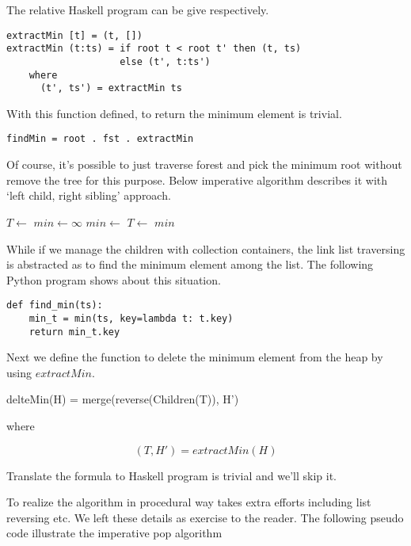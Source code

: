 \documentclass{article}
\begin{document}
The relative Haskell program can be give respectively.

\lstset{language=Haskell}
\begin{lstlisting}
extractMin [t] = (t, [])
extractMin (t:ts) = if root t < root t' then (t, ts)
                    else (t', t:ts')
    where
      (t', ts') = extractMin ts
\end{lstlisting}

With this function defined, to return the minimum element is trivial.

\begin{lstlisting}
findMin = root . fst . extractMin
\end{lstlisting}

Of course, it's possible to just traverse forest and pick the
minimum root without remove the tree for this purpose. Below
imperative algorithm describes it with `left child, right sibling'
approach.

\begin{algorithmic}[1]
  \State $T \gets $ 
  \State $min \gets \infty$
      \State $min \gets $ 
    \EndIf
    \State $T \gets $ 
  \EndWhile
  \State \Return $min$
\EndFunction
\end{algorithmic}

While if we manage the children with collection containers, the link
list traversing is abstracted as to find the minimum element among the list.
The following Python program shows about this situation.

\lstset{language=Python}
\begin{lstlisting}
def find_min(ts):
    min_t = min(ts, key=lambda t: t.key)
    return min_t.key
\end{lstlisting}

Next we define the function to delete the minimum element from
the heap by using $extractMin$.

\be
delteMin(H) = merge(reverse(Children(T)), H')
\ee

where

\[
  (T, H') = extractMin(H)
\]

Translate the formula to Haskell program is trivial and we'll skip
it.

To realize the algorithm in procedural way takes extra efforts
including list reversing etc. We left these details as exercise to the
reader. The following pseudo code illustrate the imperative
pop algorithm
\end{document}
